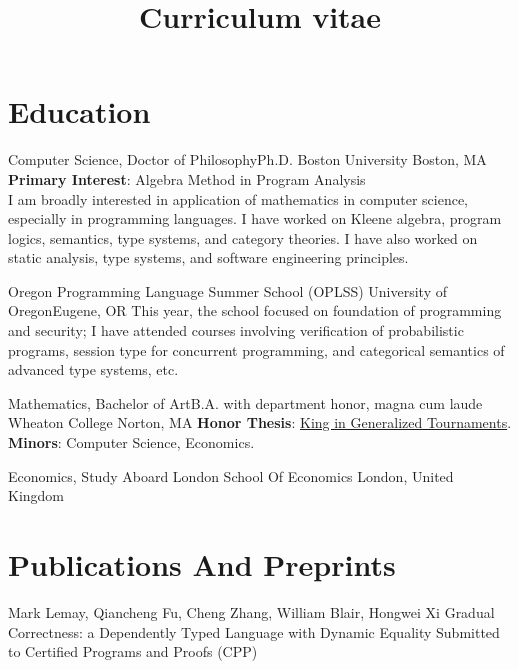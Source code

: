 \documentclass[11pt,roman]{moderncv}        %
\title{Curriculum vitae}
\begin{document}

\makecvtitle{}

\setlength{\parskip}{2.5px}
\linespread{1.3}
\selectfont


\section{Education}

{Computer Science, \iftechnical Doctor of Philosophy\else Ph.D.\fi} {}
{Boston University}
{Boston, MA}
{\textbf{Primary Interest}: Algebra Method in Program Analysis\\
\iftechnical
I am broadly interested in application of mathematics in computer science,
especially in programming languages.
I have worked on Kleene algebra, program logics, semantics, type systems,  and category theories.
\else 
I have also worked on static analysis, type systems, and software engineering principles.
\fi}  %


{Oregon Programming Language Summer School (OPLSS)}{}
{University of Oregon}{Eugene, OR}
{
\iftechnical
\else   
This year, the school focused on foundation of programming and security;
\fi
I have attended courses involving verification of probabilistic programs,
session type for concurrent programming, 
and categorical semantics of advanced type systems, etc.}


{Mathematics, \iftechnical Bachelor of Art\else B.A.\fi} {with department honor, magna cum laude}
{Wheaton College}
{Norton, MA}
{\textbf{Honor Thesis}: \href{http://hdl.handle.net/11040/24570}{King in Generalized Tournaments}.\\
\textbf{Minors}: Computer Science, Economics.
}

{Economics, Study Aboard} {}
{London School Of Economics}
{London, United Kingdom}
{}  %



\section{Publications And Preprints}

{Mark Lemay, Qiancheng Fu, Cheng Zhang, William Blair, Hongwei Xi}
{Gradual Correctness: a Dependently Typed Language with Dynamic Equality}
{Submitted to Certified Programs and Proofs (CPP)}{}{}
\end{document}
